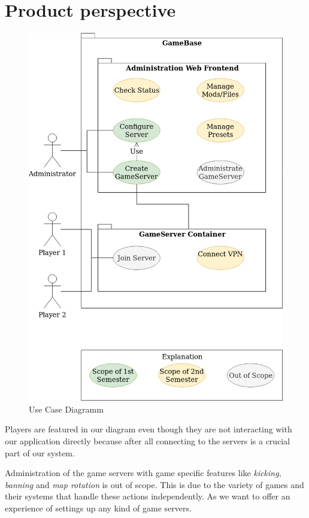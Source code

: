 \documentclass[a4paper,12pt,chapterprefix=false,bibliography=totoc,listof=totoc,]{scrreprt}
\begin{document}
\section{Product perspective}
\begin{figure}
	\includegraphics[width=\textwidth]{Use_Case_Diagramm.png}
	\caption{Use Case Diagramm}
	\label{fig:ucd}
\end{figure}
Players are featured in our diagram even though they are not interacting with our application directly because after all connecting to the servers is a crucial part of our system.

Administration of the game servers with game specific features like \emph{kicking}, \emph{banning} and \emph{map rotation} is out of scope. This is due to the variety of games and their systems that handle these actions independently. As we want to offer an experience of settings up any kind of game servers.
\end{document}
